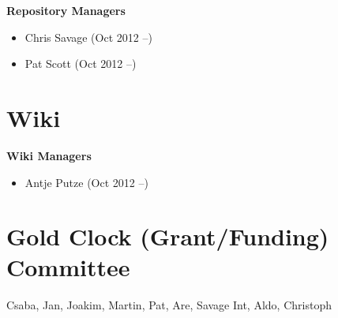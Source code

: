 \textbf{Repository Managers}
\begin{itemize}
\item Chris Savage (Oct 2012 --)
\item Pat Scott (Oct 2012 --)
\end{itemize}

\section{Wiki}

\textbf{Wiki Managers}
\begin{itemize}
\item Antje Putze (Oct 2012 --)
\end{itemize}

\section{Gold Clock (Grant/Funding) Committee}
Csaba, Jan, Joakim, Martin, Pat, Are, Savage Int, Aldo, Christoph


